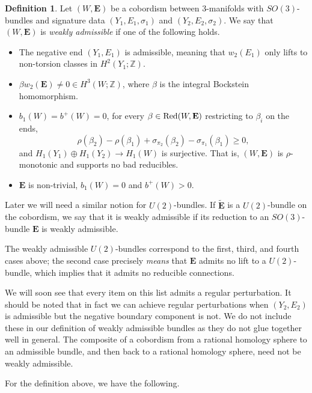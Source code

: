 \documentclass[10pt,a4paper]{amsart}
\theoremstyle{definition}
\newtheorem{definition}[theorem]{Definition}
\theoremstyle{remark}
\numberwithin{figure}{qchap}
\begin{document}
\begin{definition}\label{admiss-cob}Let $(W, \mathbf{E})$ be a cobordism between 3-manifolds with $SO(3)$-bundles and signature data $(Y_1, E_1, \sigma_1)$ and $(Y_2, E_2, \sigma_2)$. We say that $(W,\mathbf{E})$ is \textit{weakly admissible} if one of the following holds.
\begin{itemize}
    \item The negative end $(Y_1, E_1)$ is admissible, meaning that $w_2(E_1)$ only lifts to non-torsion classes in $H^2(Y_1;\mathbb Z)$.
    \item $\beta w_2(\mathbf{E}) \neq 0 \in H^3(W;\mathbb Z)$, where $\beta$ is the integral Bockstein homomorphism. 
    \item $b_1(W) = b^+(W) = 0$, for every $\beta \in \textup{Red}(W, \mathbf E)$ restricting to $\beta_i$ on the ends, $$\rho(\beta_2) - \rho(\beta_1) + \sigma_{\pi_2}(\beta_2) - \sigma_{\pi_1}(\beta_1) \geq 0,$$ and $H_1(Y_1) \oplus H_1(Y_2) \to H_1(W)$ is surjective. That is, $(W,\mathbf{E})$ is $\rho$-monotonic and supports no bad reducibles. 
    \item $\mathbf{E}$ is non-trivial, $b_1(W) = 0$ and $b^+(W) > 0$. 
\end{itemize}
Later we will need a similar notion for $U(2)$-bundles. If $\widetilde{\mathbf{E}}$ is a $U(2)$-bundle on the cobordism, we say that it is weakly admissible if its reduction to an $SO(3)$-bundle $\mathbf{E}$ is weakly admissible. 
\end{definition}

The weakly admissible $U(2)$-bundles correspond to the first, third, and fourth cases above; the second case precisely \textit{means} that $\mathbf{E}$ admits no lift to a $U(2)$-bundle, which implies that it admits no reducible connections.

We will soon see that every item on this list admits a regular perturbation. It should be noted that in fact we can achieve regular perturbations when $(Y_2, E_2)$ is admissible but the negative boundary component is not. We do not include these in our definition of weakly admissible bundles as they do not glue together well in general. The composite of a cobordism from a rational homology sphere to an admissible bundle, and then back to a rational homology sphere, need not be weakly admissible.

For the definition above, we have the following.
\end{document}
